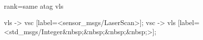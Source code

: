 \begin{figure}
{{%
	
	{rank=same atag vls}
	
	vls -> vsc [label=<sensor\string_msgs/LaserScan>];
	vsc -> vls [label=<std\string_msgs/Integer&nbsp;&nbsp;&nbsp;&nbsp;>];
		 



	

	
}}
\end{figure}
